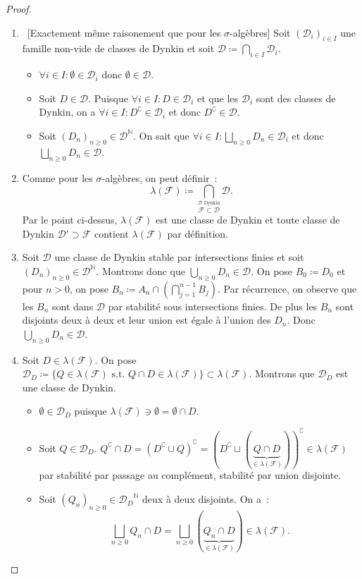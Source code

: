 \documentclass{article}
\theoremstyle{definition}
\newcommand{\st}{\text{ s.t. }}
\newcommand{\C}{\complement}
\newcommand{\N}{{\mathbb N}}
\begin{document}
\begin{proof}~
\begin{enumerate}
	\item~[Exactement même raisonement que pour les $\sigma$-algèbres] Soit $(\mathcal D_i)_{i \in I}$ une famille non-vide de classes de Dynkin et soit
	$\mathcal D \coloneqq \bigcap_{i \in I}\mathcal D_i$.

	\begin{itemize}
		\item $\forall i \in I : \emptyset \in \mathcal D_i$ donc $\emptyset \in \mathcal D$.
		\item Soit $D \in \mathcal D$. Puisque $\forall i \in I : D \in \mathcal D_i$ et que les $\mathcal D_i$ sont des classes de Dynkin, on a $\forall i \in I : D^\C \in \mathcal D_i$
		et donc $D^\C \in \mathcal D$.
		\item Soit $(D_n)_{n \geq 0} \in \mathcal D^\N$. On sait que $\forall i \in I : \bigsqcup_{n \geq 0}D_n \in \mathcal D_i$ et donc $\bigsqcup_{n \geq 0}D_n \in \mathcal D$.
	\end{itemize}

	\item Comme pour les $\sigma$-algèbres, on peut définir~:
	\[\lambda(\mathcal F) \coloneqq \bigcap_{\overset{\mathcal D \text{ Dynkin}}{\mathcal F \subset \mathcal D}}\mathcal D.\]
	Par le point ci-dessus, $\lambda(\mathcal F)$ est une classe de Dynkin et toute classe de Dynkin $\mathcal D' \supset \mathcal F$ contient $\lambda(\mathcal F)$ par définition.

	\item Soit $\mathcal D$ une classe de Dynkin stable par intersections finies et soit $(D_n)_{n \geq 0} \in \mathcal D^\N$. Montrons donc que $\bigcup_{n \geq 0}D_n \in \mathcal D$.
	On pose $B_0 \coloneqq D_0$ et pour $n > 0$, on pose $B_n \coloneqq A_n \cap (\bigcap_{j=1}^{n-1}B_j)$. Par récurrence, on observe que les $B_n$ sont dans $\mathcal D$ par
	stabilité sous intersections finies. De plus les $B_n$ sont disjoints deux à deux et leur union est égale à l'union des $D_n$. Donc $\bigcup_{n \geq 0}D_n \in \mathcal D$.

	\item Soit $D \in \lambda(\mathcal F)$. On pose $\mathcal D_D \coloneqq \{Q \in \lambda(\mathcal F) \st Q \cap D \in \lambda(\mathcal F)\} \subset \lambda(\mathcal F)$.
	Montrons que $\mathcal D_D$ est une classe de Dynkin.
	\begin{itemize}
		\item $\emptyset \in \mathcal D_D$ puisque $\lambda(\mathcal F) \ni \emptyset = \emptyset \cap D$.
		\item Soit $Q \in \mathcal D_D$. $Q^\C \cap D = (D^\C \cup Q)^\C = (D^\C \sqcup (\underbrace {Q \cap D}_{\in \lambda(\mathcal F)}))^\C \in \lambda(\mathcal F)$ par
		stabilité par passage au complément, stabilité par union disjointe.
		\item Soit $(Q_n)_{n \geq 0} \in {\mathcal D_D}^\N$ deux à deux disjoints. On a~:
		\[\bigsqcup_{n \geq 0}Q_n \cap D = \bigsqcup_{n \geq 0}(\underbrace {Q_n \cap D}_{\in \lambda(\mathcal F)}) \in \lambda(\mathcal F).\]
	\end{itemize}


\end{enumerate}
\end{proof}
\end{document}
